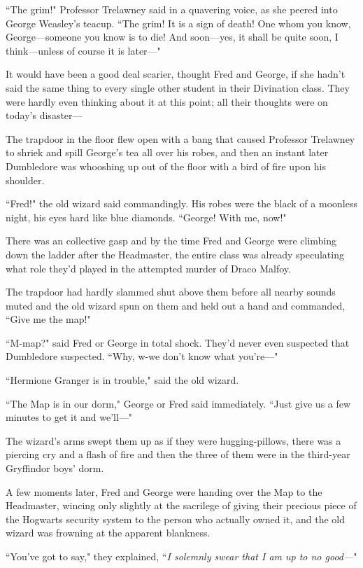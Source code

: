 ``The grim!" Professor Trelawney said in a quavering voice, as she peered into George Weasley's teacup. ``The grim! It is a sign of death! One whom you know, George—someone you know is to die! And soon—yes, it shall be quite soon, I think—unless of course it is later—"

It would have been a good deal scarier, thought Fred and George, if she hadn't said the same thing to every single other student in their Divination class. They were hardly even thinking about it at this point; all their thoughts were on today's disaster—

The trapdoor in the floor flew open with a bang that caused Professor Trelawney to shriek and spill George's tea all over his robes, and then an instant later Dumbledore was whooshing up out of the floor with a bird of fire upon his shoulder.

``Fred!" the old wizard said commandingly. His robes were the black of a moonless night, his eyes hard like blue diamonds. ``George! With me, now!"

There was an collective gasp and by the time Fred and George were climbing down the ladder after the Headmaster, the entire class was already speculating what role they'd played in the attempted murder of Draco Malfoy.

The trapdoor had hardly slammed shut above them before all nearby sounds muted and the old wizard spun on them and held out a hand and commanded, ``Give me the map!"

``M-map?" said Fred or George in total shock. They'd never even suspected that Dumbledore suspected. ``Why, w-we don't know what you're—"

``Hermione Granger is in trouble," said the old wizard.

``The Map is in our dorm," George or Fred said immediately. ``Just give us a few minutes to get it and we'll—"

The wizard's arms swept them up as if they were hugging-pillows, there was a piercing cry and a flash of fire and then the three of them were in the third-year Gryffindor boys' dorm.

A few moments later, Fred and George were handing over the Map to the Headmaster, wincing only slightly at the sacrilege of giving their precious piece of the Hogwarts security system to the person who actually owned it, and the old wizard was frowning at the apparent blankness.

``You've got to say," they explained, ``\emph{I solemnly swear that I am up to no good—}"

